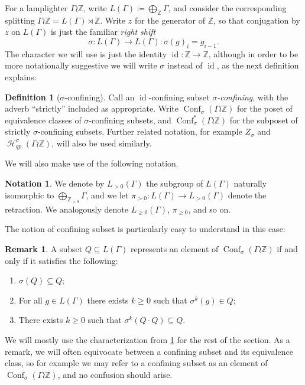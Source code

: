 \documentclass[reqno,12pt]{amsart}\setcounter{tocdepth}{1}
\theoremstyle{definition}
\newtheorem{definition}[theorem]{Definition}
\newtheorem{remark}[theorem]{Remark}
\newtheorem{notation}[theorem]{Notation}
\newcommand{\Z}{\mathbb{Z}}
\DeclareMathOperator{\id}{id}
\DeclareMathOperator{\Hyp}{\mathcal{H}}
\DeclareMathOperator{\Conf}{Conf}
\numberwithin{equation}{section}
\begin{document}
For a lamplighter $\Gamma \wr \Z$, write $L(\Gamma) \coloneqq \bigoplus_{\Z} \Gamma$, and consider the corresponding splitting $\Gamma \wr \Z = L(\Gamma) \rtimes \Z$. Write $z$ for the generator of $\Z$, so that conjugation by $z$ on $L(\Gamma)$ is just the familiar \emph{right shift}
\[\sigma \colon L(\Gamma) \to L(\Gamma) : \sigma(g)_i = g_{i-1}.\]
The character we will use is just the identity $\id\colon \Z\to\Z$, although in order to be more notationally suggestive we will write $\sigma$ instead of $\id$, as the next definition explains:

\begin{definition}[$\sigma$-confining]
Call an $\id$-confining subset \emph{$\sigma$-confining}, with the adverb ``strictly'' included as appropriate. Write $\Conf_\sigma(\Gamma \wr \Z)$ for the poset of equivalence classes of $\sigma$-confining subsets, and $\Conf^\ast_\sigma(\Gamma \wr \Z)$ for the subposet of strictly $\sigma$-confining subsets. Further related notation, for example $Z_\sigma$ and $\Hyp_{qp}^\sigma(\Gamma\wr\Z)$, will also be used similarly.
\end{definition}

We will also make use of the following notation.

\begin{notation}\label{not:projection}
We denote by $L_{>0}(\Gamma)$ the subgroup of $L(\Gamma)$ naturally isomorphic to $\bigoplus_{\Z_{>0}} \Gamma$, and we let $\pi_{>0} \colon L(\Gamma) \to L_{>0}(\Gamma)$ denote the retraction. We analogously denote $L_{\geq 0}(\Gamma)$, $\pi_{\geq 0}$, and so on.
\end{notation}

The notion of confining subset is particularly easy to understand in this case: 

\begin{remark}\label{rem:shift}
A subset $Q \subseteq L(\Gamma)$ represents an element of $\Conf_\sigma(\Gamma \wr \Z)$ if and only if it satisfies the following:
\begin{enumerate}
\item $\sigma(Q) \subseteq Q$;
\item For all $g \in L(\Gamma)$ there exists $k \geq 0$ such that $\sigma^k(g) \in Q$;
\item There exists $k \geq 0$ such that $\sigma^k(Q \cdot Q) \subseteq Q$.
\end{enumerate}
\end{remark}

We will mostly use the characterization from \cref{rem:shift} for the rest of the section. As a remark, we will often equivocate between a confining subset and its equivalence class, so for example we may refer to a confining subset as an element of $\Conf_\sigma(\Gamma \wr \Z)$, and no confusion should arise.
\end{document}
